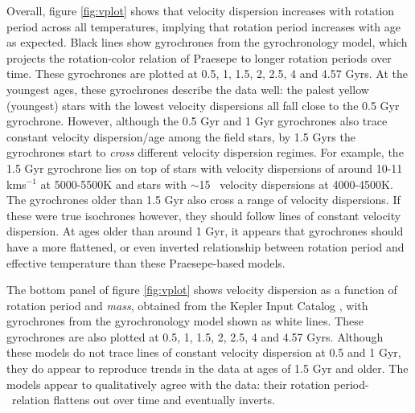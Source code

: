 Overall, figure \ref{fig:vplot} shows that velocity dispersion increases with
rotation period across all temperatures, implying that rotation period
increases with age as expected.
Black lines show gyrochrones from the \citet{angus2019} gyrochronology model,
which projects the rotation-color relation of Praesepe to longer rotation
periods over time.
These gyrochrones are plotted at 0.5, 1, 1.5, 2, 2.5, 4 and 4.57 Gyrs.
At the youngest ages, these gyrochrones describe the data well: the palest
yellow (youngest) stars with the lowest velocity dispersions all fall close to
the 0.5 Gyr gyrochrone.
However, although the 0.5 Gyr and 1 Gyr gyrochrones also trace constant
velocity dispersion/age among the field stars, by 1.5 Gyrs the gyrochrones
start to {\it cross} different velocity dispersion regimes.
For example, the 1.5 Gyr gyrochrone lies on top of stars with velocity
dispersions of around 10-11 kms$^{-1}$ at 5000-5500K and stars with $\sim$15
\kms\ velocity dispersions at 4000-4500K.
The gyrochrones older than 1.5 Gyr also cross a range of velocity dispersions.
If these were true isochrones however, they should follow lines of constant
velocity dispersion.
At ages older than around 1 Gyr, it appears that gyrochrones should have a more
flattened, or even inverted relationship between rotation period and effective
temperature than these Praesepe-based models.

The bottom panel of figure \ref{fig:vplot} shows velocity dispersion as a
function of rotation period and {\it mass}, obtained from the Kepler Input
Catalog \citep{brown2011}, with gyrochrones from the \citep{spada2019}
gyrochronology model shown as white lines.
These gyrochrones are also plotted at 0.5, 1, 1.5, 2, 2.5, 4 and 4.57 Gyrs.
Although these models do not trace lines of constant velocity dispersion at
0.5 and 1 Gyr, they do appear to reproduce trends in the data at ages of 1.5
Gyr and older.
The \citet{spada2019} models appear to qualitatively agree with the data:
their rotation period-\teff\ relation flattens out over time and eventually
inverts.

